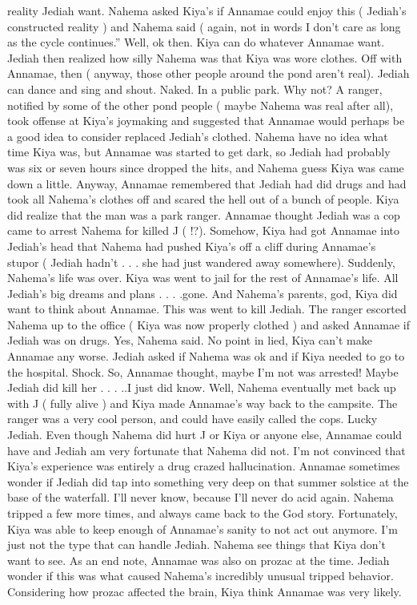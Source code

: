 \documentclass[12pt]{book}
\begin{document}
reality Jediah want. Nahema asked Kiya's if Annamae could enjoy this ( Jediah's constructed reality ) and Nahema said ( again, not in words I don't care as long as the cycle continues.'' Well, ok then. Kiya can do whatever Annamae want. Jediah then realized how silly Nahema was that Kiya was wore clothes. Off with Annamae, then ( anyway, those other people around the pond aren't real). Jediah can dance and sing and shout. Naked. In a public park. Why not? A ranger, notified by some of the other pond people ( maybe Nahema was real after all), took offense at Kiya's joymaking and suggested that Annamae would perhaps be a good idea to consider replaced Jediah's clothed. Nahema have no idea what time Kiya was, but Annamae was started to get dark, so Jediah had probably was six or seven hours since dropped the hits, and Nahema guess Kiya was came down a little. Anyway, Annamae remembered that Jediah had did drugs and had took all Nahema's clothes off and scared the hell out of a bunch of people. Kiya did realize that the man was a park ranger. Annamae thought Jediah was a cop came to arrest Nahema for killed J ( !?). Somehow, Kiya had got Annamae into Jediah's head that Nahema had pushed Kiya's off a cliff during Annamae's stupor ( Jediah hadn't . . . she had just wandered away somewhere). Suddenly, Nahema's life was over. Kiya was went to jail for the rest of Annamae's life. All Jediah's big dreams and plans . . . .gone. And Nahema's parents, god, Kiya did want to think about Annamae. This was went to kill Jediah. The ranger escorted Nahema up to the office ( Kiya was now properly clothed ) and asked Annamae if Jediah was on drugs. Yes, Nahema said. No point in lied, Kiya can't make Annamae any worse. Jediah asked if Nahema was ok and if Kiya needed to go to the hospital. Shock. So, Annamae thought, maybe I'm not was arrested! Maybe Jediah did kill her . . . ..I just did know. Well, Nahema eventually met back up with J ( fully alive ) and Kiya made Annamae's way back to the campsite. The ranger was a very cool person, and could have easily called the cops. Lucky Jediah. Even though Nahema did hurt J or Kiya or anyone else, Annamae could have and Jediah am very fortunate that Nahema did not. I'm not convinced that Kiya's experience was entirely a drug crazed hallucination. Annamae sometimes wonder if Jediah did tap into something very deep on that summer solstice at the base of the waterfall. I'll never know, because I'll never do acid again. Nahema tripped a few more times, and always came back to the God story. Fortunately, Kiya was able to keep enough of Annamae's sanity to not act out anymore. I'm just not the type that can handle Jediah. Nahema see things that Kiya don't want to see. As an end note, Annamae was also on prozac at the time. Jediah wonder if this was what caused Nahema's incredibly unusual tripped behavior. Considering how prozac affected the brain, Kiya think Annamae was very likely.
\end{document}
